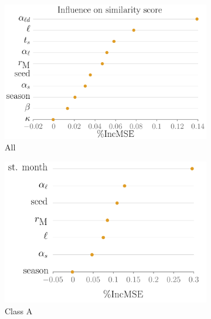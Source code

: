 \documentclass[11pt]{article}
\theoremstyle{definition}
\begin{document}
\begin{figure}[t]
\centering
\begin{subfigure}[b]{.32\textwidth}
    \includegraphics[width=1.1\textwidth]{../cellular_automata/results/rf/rf_importance_all_mse.pdf}
\caption{All\label{fig:rfAll}}
\end{subfigure}\hspace{2mm}
\begin{subfigure}[b]{.32\textwidth}
    \includegraphics[width=1.1\textwidth]{../cellular_automata/results/rf/rf_importance_short_mse.pdf}
\caption{Class A\label{fig:rfShort}}
\end{subfigure}
\begin{subfigure}[b]{.32\textwidth}

\end{subfigure}
\end{figure}
\end{document}
